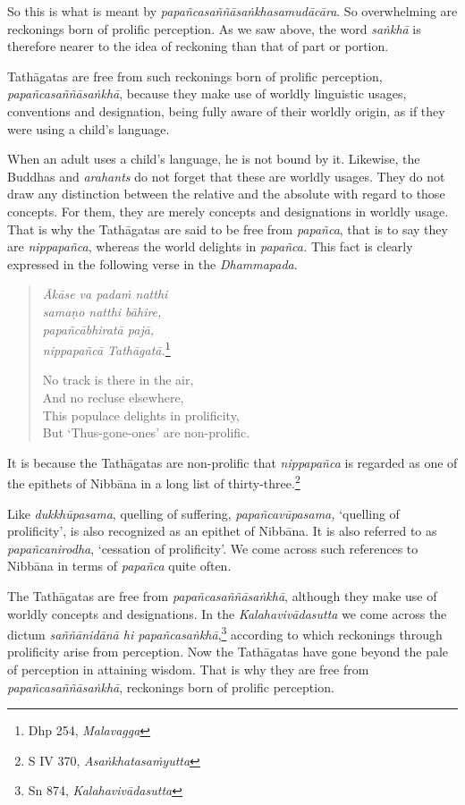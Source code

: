 So this is what is meant by \emph{papañcasaññāsaṅkhasamudācāra}. So overwhelming are reckonings born of prolific perception. As we saw above, the word \emph{saṅkhā} is therefore nearer to the idea of reckoning than that of part or portion.

Tathāgatas are free from such reckonings born of prolific perception, \emph{papañcasaññāsaṅkhā}, because they make use of worldly linguistic usages, conventions and designation, being fully aware of their worldly origin, as if they were using a child's language.

When an adult uses a child's language, he is not bound by it. Likewise, the Buddhas and \emph{arahants} do not forget that these are worldly usages. They do not draw any distinction between the relative and the absolute with regard to those concepts. For them, they are merely concepts and designations in worldly usage. That is why the Tathāgatas are said to be free from \emph{papañca}, that is to say they are \emph{nippapañca}, whereas the world delights in \emph{papañca.} This fact is clearly expressed in the following verse in the \emph{Dhammapada}.

\begin{quote}
\emph{Ākāse va padaṁ natthi}\\
\emph{samaṇo natthi bāhire,}\\
\emph{papañcābhiratā pajā,}\\
\emph{nippapañcā Tathāgatā.}\footnote{Dhp 254, \emph{Malavagga}}

No track is there in the air,\\
And no recluse elsewhere,\\
This populace delights in prolificity,\\
But `Thus-gone-ones' are non-prolific.
\end{quote}

It is because the Tathāgatas are non-prolific that \emph{nippapañca} is regarded as one of the epithets of Nibbāna in a long list of thirty-three.\footnote{S IV 370, \emph{Asaṅkhatasaṁyutta}}

Like \emph{dukkhūpasama}, quelling of suffering, \emph{papañcavūpasama,} `quelling of prolificity', is also recognized as an epithet of Nibbāna. It is also referred to as \emph{papañcanirodha}, `cessation of prolificity'. We come across such references to Nibbāna in terms of \emph{papañca} quite often.

The Tathāgatas are free from \emph{papañcasaññāsaṅkhā}, although they make use of worldly concepts and designations. In the \emph{Kalahavivādasutta} we come across the dictum \emph{saññānidānā hi papañcasaṅkhā},\footnote{Sn 874, \emph{Kalahavivādasutta}} according to which reckonings through prolificity arise from perception. Now the Tathāgatas have gone beyond the pale of perception in attaining wisdom. That is why they are free from \emph{papañcasaññāsaṅkhā}, reckonings born of prolific perception.

